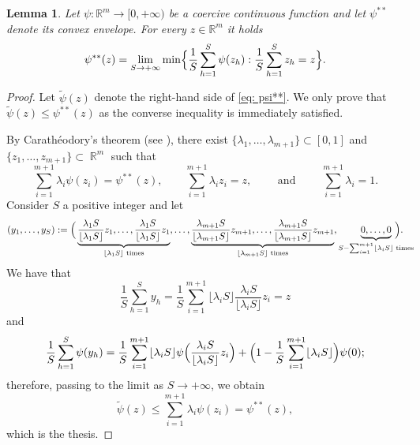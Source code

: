 \documentclass{article}
\theoremstyle{plain}
\newtheorem{lemma}[theorem]{Lemma}
\theoremstyle{definition}
\def\rr{{\mathbb R}}
\DeclareMathOperator*{\R}{\mathbb{R}}
\numberwithin{equation}{section}
\begin{document}
\begin{lemma}\label{lemma: psi**} Let $\psi:\rr^m\to[0,+\infty)$ be a coercive continuous function and let $\psi^{**}$ denote its convex envelope. For every $z\in\rr^m$ it holds
\begin{equation}\label{eq: psi**}
     \psi^{**}(z)=\lim_{S\to+\infty}\min\Bigl\{\frac{1}{S}\sum_{h=1}^S\psi(z_h): \frac{1}{S}\sum_{h=1}^Sz_h=z\Bigr\}.
 \end{equation}
\end{lemma}
\begin{proof}
Let $\widetilde{\psi}(z)$ denote the right-hand side of \eqref{eq: psi**}. We only prove that $\widetilde{\psi}(z)\leq \psi^{**}(z)$ as the converse  inequality is immediately satisfied.

By Carathéodory's theorem (see \cite[Theorem 17.1]{R}), there exist $\{\lambda_1,\dots,\lambda_{m+1}\}\subset[0,1]$ and $\{z_1,\dots,z_{m+1}\}\subset\R^m$ such that
\begin{equation*}
    \sum_{i=1}^{m+1}\lambda_i\psi(z_i)=\psi^{**}(z),  \qquad \sum_{i=1}^{m+1}\lambda_iz_i=z, \qquad \text{ and } \qquad\sum_{i=1}^{m+1}\lambda_i=1.
\end{equation*}
Consider $S$ a positive integer and let
\begin{equation*}
(y_1,\dots,y_{S}):=\Bigl(\,\underbrace{\frac{\lambda_1S}{\lfloor\lambda_1S\rfloor}z_1,\dots,\frac{\lambda_1S}{\lfloor\lambda_1S\rfloor}z_1}_{\lfloor\lambda_1S\rfloor\text{ times} },\dots,\underbrace{\frac{\lambda_{m+1}S}{\lfloor\lambda_{m+1}S\rfloor}z_{m+1},\dots,\frac{\lambda_{m+1}S}{\lfloor\lambda_{m+1}S\rfloor}z_{m+1}}_{\lfloor\lambda_{m+1}S\rfloor\text{ times} }, \underbrace{0,\dots,0}_{S-\sum_{i=1}^{m+1}\lfloor\lambda_i S\rfloor \text{ times}}\hspace{-0.7cm}\Bigr).
\end{equation*}
We have that 
\begin{equation*}
    \frac{1}{S}\sum_{h=1}^Sy_h=  \frac{1}{S}\sum_{i=1}^{m+1}\lfloor\lambda_i S\rfloor\frac{\lambda_iS}{\lfloor\lambda_iS\rfloor}z_i= z
\end{equation*}
and 
\begin{equation*}
     \frac{1}{S}\sum_{h=1}^S\psi(y_h) =\frac{1}{S}\sum_{i=1}^{m+1}\lfloor\lambda_i S\rfloor\psi\Bigl(\frac{\lambda_iS}{\lfloor\lambda_iS\rfloor}z_i\Bigr)+\Bigl(1-\frac{1}{S}\sum_{i=1}^{m+1}\lfloor\lambda_iS\rfloor\Bigr)\psi(0);   
\end{equation*}
therefore, passing to the limit as $S\to+\infty$, we obtain
\begin{equation*}
    \widetilde{\psi}(z)\leq \sum_{i=1}^{m+1}\lambda_i\psi(z_i)= \psi^{**}(z),
\end{equation*}
which is the thesis.
\end{proof}
\end{document}
